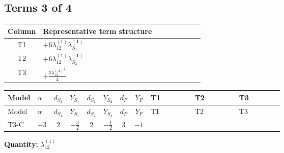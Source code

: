 \documentclass[8pt]{article}
\begin{document}
\begin{landscape}
\subsection*{Terms 3 of 4}
\begin{center}
\begin{tabular}{@{}c >{\raggedright\arraybackslash}p{0.82\linewidth}@{}}
\toprule
Column & Representative term structure \\
\midrule
T1 & \(\displaystyle +6 {\lambda_{12}^{(1)}} {\lambda_{S_1}^{(1)}}\) \\
\midrule
T2 & \(\displaystyle +6 {\lambda_{12}^{(1)}} {\lambda_{S_2}^{(1)}}\) \\
\midrule
T3 & \(\displaystyle +\frac{3 {\lambda_{12}^{(A)}}^2}{4}\) \\
\midrule
\bottomrule
\end{tabular}
\end{center}
\smallskip
\tiny
\begin{longtable}{@{}llcccccc >{\raggedright\arraybackslash}p{0.21\linewidth} >{\raggedright\arraybackslash}p{0.21\linewidth} >{\raggedright\arraybackslash}p{0.21\linewidth}@{}}
\toprule
Model & $\alpha$ & $d_{S_1}$ & $Y_{S_1}$ & $d_{S_2}$ & $Y_{S_2}$ & $d_F$ & $Y_F$ & T1 & T2 & T3 \\
\midrule
\endfirsthead
\toprule
Model & $\alpha$ & $d_{S_1}$ & $Y_{S_1}$ & $d_{S_2}$ & $Y_{S_2}$ & $d_F$ & $Y_F$ & T1 & T2 & T3 \\
\midrule
\endhead
T3-C & $-3$ & $2$ & $-\frac{3}{2}$ & $2$ & $-\frac{1}{2}$ & $3$ & $-1$ & \scriptsize\adjustbox{max width=\linewidth}{$\begin{gathered} +6 {\lambda_{12}^{(1)}} {\lambda_{S_1}^{(1)}}\end{gathered}$} & \scriptsize\adjustbox{max width=\linewidth}{$\begin{gathered} +6 {\lambda_{12}^{(1)}} {\lambda_{S_2}^{(1)}}\end{gathered}$} & \scriptsize\adjustbox{max width=\linewidth}{$\begin{gathered} +\frac{3 {\lambda_{12}^{(A)}}^2}{4}\end{gathered}$} \\
\midrule
\bottomrule
\end{longtable}
\clearpage
\noindent\textbf{Quantity: }$\lambda_{12}^{(1)}$\par\smallskip

\end{landscape}
\end{document}
